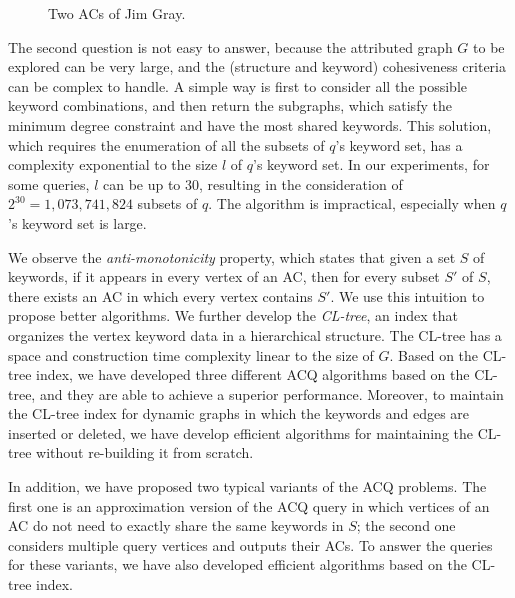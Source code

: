 \begin{figure}[ht]
{{            \label{fig:jim2}
        }
    }
    \caption{Two ACs of Jim Gray.}\label{fig:jim}
\end{figure}

The second question is not easy to answer, because the attributed graph $G$ to be explored can be very large, and the (structure and keyword) cohesiveness criteria can be complex to handle. A simple way is first to consider all the possible keyword combinations, and then return the subgraphs, which satisfy the minimum degree constraint and have the most shared keywords. This solution, which requires the enumeration of all the subsets of $q$'s keyword set, has a complexity exponential to the size $l$ of $q$'s keyword set. In our experiments, for some queries, $l$ can be up to 30, resulting in the consideration of $2^{30}=1,073,741,824$ subsets of $q$. The algorithm is impractical, especially when $q$'s keyword set is large.

{\color{blue}
We observe the {\it anti-monotonicity} property, which states that given a set $S$ of keywords, if it appears in every vertex of an AC, then for every subset $S'$ of $S$, there exists an AC in which every vertex contains $S'$. We use this intuition to propose better algorithms. We further develop the \emph{CL-tree}, an index that organizes the vertex keyword data in a hierarchical structure. The CL-tree has a space and construction time complexity linear to the size of $G$. 
Based on the CL-tree index, we have developed three different ACQ algorithms based on the CL-tree, and they are able to achieve a superior performance.
Moreover, to maintain the CL-tree index for dynamic graphs in which the keywords and edges are inserted or deleted, we have develop efficient algorithms for maintaining the CL-tree without re-building it from scratch.

In addition, we have proposed two typical variants of the ACQ problems. The first one is an approximation version of the ACQ query in which vertices of an AC do not need to exactly share the same keywords in $S$;
the second one considers multiple query vertices and outputs their ACs.
To answer the queries for these variants, we have also developed efficient algorithms based on the CL-tree index.
}

